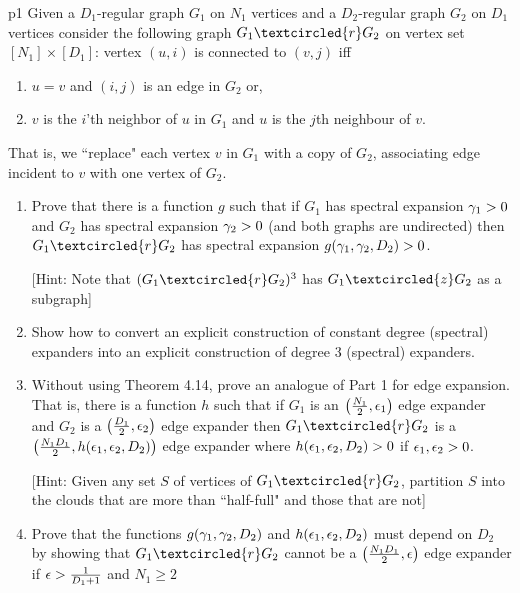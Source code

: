 \documentclass[a4paper, 11pt]{article}
\begin{document}

\begin{problem}{%
	}{p1%
	}
	Given a $D_1$-regular graph $G_1$ on $N_1$ vertices and a $D_2$-regular graph $G_2$ on $D_1$ vertices consider the following graph $G_1\textcircled{r}G_2$ on vertex set $[N_1]\times [D_1]$: vertex $(u,i)$ is connected to $(v,j)$ iff \begin{enumerate}[label=(\alph*)]
		\item $u=v$ and $(i,j)$ is an edge in $G_2$ or,
		\item $v$ is the $i$'th neighbor of $u$ in $G_1$ and $u$ is the $j$th neighbour of $v$. 
	\end{enumerate}
	That is, we ``replace" each vertex $v$ in $G_1$ with a copy of $G_2$, associating edge incident to $v$ with one vertex of $G_2$.
	\begin{enumerate}
		\item Prove that there is a function $g$ such that if $G_1$ has spectral expansion $\gamma_1>0$ and $G_2$ has spectral expansion $\gamma_2>0$ (and both graphs are undirected) then $G_1\textcircled{r}G_2$ has spectral expansion $g(\gamma_1,\gamma_2,D_2)>0$.
		
		[Hint: Note that $(G_1\textcircled{r}G_2)^3$ has $G_1\textcircled{z}G_2$ as a subgraph]
		\item Show how to convert an explicit construction of constant degree (spectral) expanders into an explicit construction of degree 3 (spectral) expanders.
		\item Without using Theorem 4.14, prove an analogue of Part 1 for edge expansion. That is, there is a function $h$ such that if $G_1$ is an $\left(\frac{N_1}2,\epsilon_1\right)$ edge expander and $G_2$ is a $\left(\frac{D_1}2,\epsilon_2\right)$ edge expander then $G_1\textcircled{r}G_2$ is a $\left(\frac{N_1D_1}{2},h(\epsilon_1,\epsilon_2,D_2)\right)$ edge expander where $h(\epsilon_1,\epsilon_2,D_2)>0$ if $\epsilon_1,\epsilon_2>0$. 
		
		[Hint: Given any set $S$ of vertices of $G_1\textcircled{r}G_2$, partition $S$ into the clouds that are more than ``half-full" and those that are not]
		\item Prove that the functions $g(\gamma_1,\gamma_2,D_2)$ and $h(\epsilon_1,\epsilon_2,D_2)$ must depend on $D_2$ by showing that $G_1\textcircled{r}G_2$ cannot be a $\left(\frac{N_1D_1}2,\epsilon\right)$ edge expander if $\epsilon>\frac1{D_1+1}$ and $N_1\geq 2$
	\end{enumerate}
\end{problem}
\end{document}
